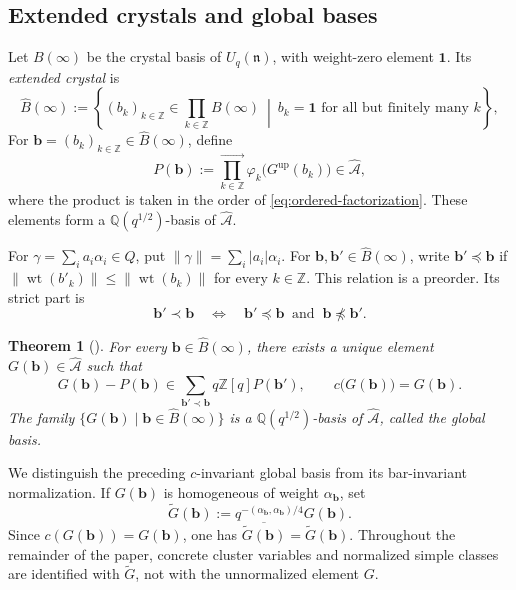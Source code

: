 \documentclass[12pt, reqno]{amsart}
\theoremstyle{plain}
\newtheorem{theorem}{Theorem}[section]
\theoremstyle{definition}
\numberwithin{equation}{section}
\newcommand{\ZZ}{\mathbb{Z}}
\newcommand{\QQ}{\mathbb{Q}}
\newcommand{\bb}{\mathbf{b}}
\newcommand{\cA}{\mathcal{A}}
\DeclareMathOperator*{\wt}{wt}
\begin{document}
\subsection{Extended crystals and global bases}

Let \(B(\infty)\) be the crystal basis of \(U_q(\mathfrak n)\), with
weight-zero element \(\mathbf1\). Its \emph{extended crystal} is
\begin{equation}\label{eq:extended-crystal}
    \widehat B(\infty)
    :=\left\{
        (b_k)_{k\in\ZZ}\in\prod_{k\in\ZZ}B(\infty)
        \ \middle|\
        b_k=\mathbf1\text{ for all but finitely many }k
    \right\},
\end{equation}
For \(\bb=(b_k)_{k\in\ZZ}\in\widehat B(\infty)\), define
\begin{equation}\label{eq:standard-basis-element}
    P(\bb)
    :=\overrightarrow{\prod_{k\in\ZZ}}
      \varphi_k\bigl(G^{\mathrm{up}}(b_k)\bigr)
    \in\widehat{\cA},
\end{equation}
where the product is taken in the order of
\eqref{eq:ordered-factorization}. These elements form a
\(\QQ(q^{1/2})\)-basis of \(\widehat{\cA}\).

For \(\gamma=\sum_i a_i\alpha_i\in Q\), put
\(\|\gamma\|=\sum_i|a_i|\alpha_i\). For
\(\bb,\bb'\in\widehat B(\infty)\), write \(\bb'\preceq\bb\) if
\(\|\wt(b'_k)\|\leq\|\wt(b_k)\|\) for every \(k\in \ZZ\).
This relation is a preorder. Its strict part is
\begin{equation}\label{eq:strict-extended-crystal-preorder}
    \bb'\prec\bb
    \quad\Longleftrightarrow\quad
    \bb'\preceq\bb\ \text{ and }\ \bb\not\preceq\bb'.
\end{equation}


\begin{theorem}[{\cite[Theorem~7.6]{kashiwara2025global}}]
    \label{theo:globalbasis}
    For every \(\bb\in\widehat B(\infty)\), there exists a unique
    element \(G(\bb)\in\widehat{\cA}\) such that
    \begin{equation}\label{eq:global-basis-triangularity}
        G(\bb)-P(\bb)
        \in\sum_{\bb'\prec\bb}q\ZZ[q]P(\bb'),
        \qquad
        c\bigl(G(\bb)\bigr)=G(\bb).
    \end{equation}
    The family
    \(\{G(\bb)\mid\bb\in\widehat B(\infty)\}\) is a
    \(\QQ(q^{1/2})\)-basis of \(\widehat{\cA}\), called the
    \emph{global basis}.
\end{theorem}

 We distinguish the preceding \(c\)-invariant
global basis from its bar-invariant normalization. If \(G(\bb)\) is
homogeneous of weight \(\alpha_{\bb}\), set
\begin{equation}\label{eq:normalized-global-basis-conversion}
    \widetilde G(\bb)
    :=q^{-(\alpha_{\bb},\alpha_{\bb})/4}G(\bb).
\end{equation}
Since \(c(G(\bb))=G(\bb)\), one has
\(\overline{\widetilde G(\bb)}=\widetilde G(\bb)\).
Throughout the remainder of the paper, concrete cluster variables
and normalized simple classes are identified with
\(\widetilde G\), not with the unnormalized element \(G\).
\end{document}
